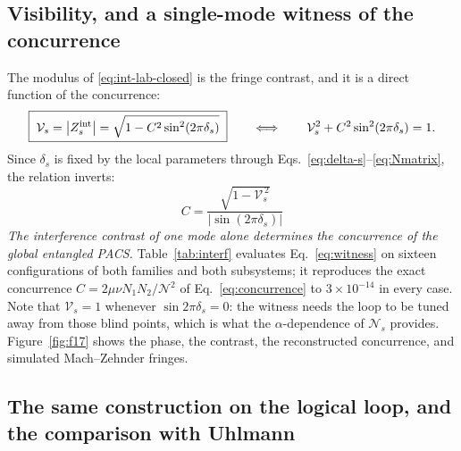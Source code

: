 \documentclass[11pt]{article}
\begin{document}
\subsection{Visibility, and a single-mode witness of the concurrence}

The modulus of \eqref{eq:int-lab-closed} is the fringe contrast, and it is a
direct function of the concurrence:
\begin{equation}
\boxed{\;\mathcal V_s=\big|Z^{\rm int}_s\big|
=\sqrt{1-C^2\sin^2(2\pi\delta_s)}\;}
\qquad\Longleftrightarrow\qquad
\mathcal V_s^2+C^2\sin^2(2\pi\delta_s)=1 .
\label{eq:visibility}
\end{equation}
Since $\delta_s$ is fixed by the local parameters through
Eqs.~\eqref{eq:delta-s}--\eqref{eq:Nmatrix}, the relation inverts:
\begin{equation}
\boxed{\;C=\frac{\sqrt{1-\mathcal V_s^{\,2}}}{\left|\sin(2\pi\delta_s)\right|}\;}
\label{eq:witness}
\end{equation}
\emph{The interference contrast of one mode alone determines the concurrence of
the global entangled PACS.} Table~\ref{tab:interf} evaluates
Eq.~\eqref{eq:witness} on sixteen configurations of both families and both
subsystems; it reproduces the exact concurrence
$C=2\mu\nu N_1N_2/\mathcal N^2$ of Eq.~\eqref{eq:concurrence} to
$3\times10^{-14}$ in every case. Note that $\mathcal V_s=1$ whenever
$\sin2\pi\delta_s=0$: the witness needs the loop to be tuned away from those
blind points, which is what the $\alpha$-dependence of $\mathcal N_s$ provides.
Figure~\ref{fig:f17} shows the phase, the contrast, the reconstructed
concurrence, and simulated Mach--Zehnder fringes.

\subsection{The same construction on the logical loop, and the comparison with
Uhlmann}
\end{document}
